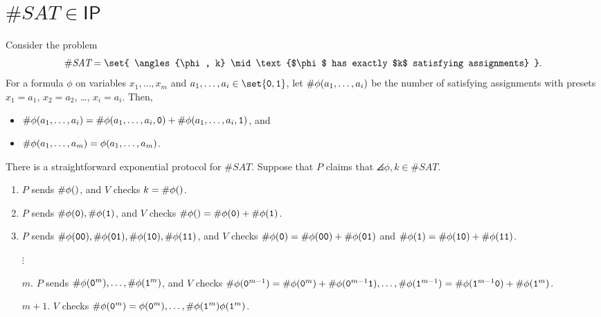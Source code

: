 \documentclass{standalone}
\begin{document}
\section{\texorpdfstring{\(\texttt\#\textit{SAT} \in \mathsf{IP}\)}{\#SAT in IP}}
Consider the problem
\[
	\textsf\#\textit{SAT} = \set{
    \angles{\phi, k} \mid \text{$\phi$ has exactly $k$ satisfying assignments}
  }.
\]
For a formula \(\phi\) on variables \(x_1, \dots, x_m\) and
\(a_1, \dots, a_i \in \set{\mathtt 0, \mathtt 1}\),
let \(\operatorname{\textsf\#\phi}(a_1, \dots, a_i)\) be the number of satisfying assignments
with presets \(x_1 = a_1\), \(x_2 = a_2\), \ldots, \(x_i = a_i\).
Then,
\begin{itemize}
	\item \(\operatorname{\textsf\#\phi}(a_1, \dots, a_i) = \operatorname{\textsf\#\phi}(a_1, \dots, a_i, \mathtt 0) +
                                     \operatorname{\textsf\#\phi}(a_1, \dots, a_i, \mathtt 1)\), and
	\item \(\operatorname{\textsf\#\phi}(a_1, \dots, a_m) = \phi(a_1, \dots, a_m)\).
\end{itemize}

There is a straightforward exponential protocol for \(\texttt\#\textit{SAT}\).
Suppose that \(P\) claims that \(\angles{\phi, k} \in \texttt\#\textit{SAT}\).
\begin{enumerate}[start=0]
	\item \(P\) sends \(\operatorname{\textsf\#\phi}()\), and \(V\) checks \(k = \operatorname{\textsf\#\phi}()\).
	\item \(P\) sends \(\operatorname{\textsf\#\phi}(\mathtt 0), \operatorname{\textsf\#\phi}(\mathtt 1)\),
    and \(V\) checks \(\operatorname{\textsf\#\phi}() = \operatorname{\textsf\#\phi}(\mathtt 0) + \operatorname{\textsf\#\phi}(\mathtt 1)\).
	\item \(P\) sends \(\operatorname{\textsf\#\phi}(\mathtt{00}),
                      \operatorname{\textsf\#\phi}(\mathtt{01}),
                      \operatorname{\textsf\#\phi}(\mathtt{10}),
                      \operatorname{\textsf\#\phi}(\mathtt{11})\),
    and \(V\) checks \(\operatorname{\textsf\#\phi}(\mathtt 0) = \operatorname{\textsf\#\phi}(\mathtt{00}) +
                                            \operatorname{\textsf\#\phi}(\mathtt{01})\)
                 and \(\operatorname{\textsf\#\phi}(\mathtt 1) = \operatorname{\textsf\#\phi}(\mathtt{10}) +
                                            \operatorname{\textsf\#\phi}(\mathtt{11})\).
	\item[\(\vdots\)]
	\item[\(m\).] \(P\) sends \(\operatorname{\textsf\#\phi}(\mathtt{0}^m), \dots,
                              \operatorname{\textsf\#\phi}(\mathtt 1^m)\), and \(V\) checks
    \(\operatorname{\textsf\#\phi}(\mathtt 0^{m - 1}) = \operatorname{\textsf\#\phi}(\mathtt 0^m) +
                                   \operatorname{\textsf\#\phi}(\mathtt 0^{m - 1} \mathtt 1), \dots,
      \operatorname{\textsf\#\phi}(\mathtt 1^{m - 1}) = \operatorname{\textsf\#\phi}(\mathtt 1^{m - 1} \mathtt 0) +
                                   \operatorname{\textsf\#\phi}(\mathtt 1^m)\).
	\item[\(m + 1\).] \(V\) checks \(\operatorname{\textsf\#\phi}(\mathtt 0^m) = \phi(\mathtt 0^m),
                            \dots, \operatorname{\textsf\#\phi}(\mathtt 1^m) \phi(\mathtt 1^m)\).
\end{enumerate}
\end{document}
